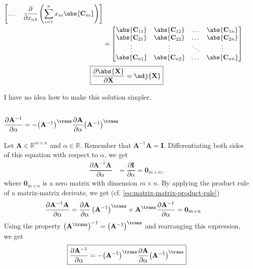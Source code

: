 \begin{align}
\begin{bmatrix}
        \dots & 
        \displaystyle \dfrac{\partial}{\partial x_{n3}} \left( \sum_{i = 1}^{n} x_{ni} \abs{\mathbf{C}_{ni}} \right) \\
    \end{bmatrix} \\
    &= \begin{bmatrix}
        \abs{\mathbf{C}_{11}} & \abs{\mathbf{C}_{12}} & \dots & \abs{\mathbf{C}_{1n}} \\
        \abs{\mathbf{C}_{21}} & \abs{\mathbf{C}_{22}} & \dots & \abs{\mathbf{C}_{2n}} \\
        \vdots & \vdots & \ddots & \vdots \\
        \abs{\mathbf{C}_{n1}} & \abs{\mathbf{C}_{n2}} & \dots & \abs{\mathbf{C}_{nn}} \\
    \end{bmatrix}
\end{align}
\begin{align}
    \boxed{\dfrac{\partial \abs{\mathbf{X}}}{\partial \mathbf{X}} = \adj{\mathbf{X}}}
\end{align}

I have no idea how to make this solution simpler.

\subsection{\(\dfrac{\partial \mathbf{A}^{-1}}{\partial \alpha} = - {\left( \mathbf{A}^{-1} \right)}^{\trans} \dfrac{\partial \mathbf{A}}{\partial \alpha} {\left( \mathbf{A}^{-1} \right)}^{\trans}\)}
Let \(\mathbf{A}\in \mathbb{R}^{m\times n}\) and \(\alpha \in \mathbb{R}\). Remember that \(\mathbf{A}^{-1}\mathbf{A} = \mathbf{I}\). Differentiating both sides of this equation with respect to \(\alpha\), we get
\begin{align}
    \dfrac{\partial \mathbf{A}^{-1}\mathbf{A}}{\partial \alpha} & = \dfrac{\partial \mathbf{I}}{\partial \alpha} = \mathbf{0}_{m \times n},
\end{align}
where \(\mathbf{0}_{m \times n}\) is a zero matrix with dimension \(m \times n\). By applying the product rule of a matrix-matrix derivate, we get (cf. \eqref{eq:matrix-matrix-product-rule})
\begin{align}
    \dfrac{\partial \mathbf{A}^{-1}\mathbf{A}}{\partial \alpha} =  \dfrac{\partial \mathbf{A}}{\partial \alpha} \left( \mathbf{A}^{-1} \right)^{\trans} + \mathbf{A}^{\trans} \dfrac{\partial \mathbf{A}^{-1}}{\partial \alpha} & = \mathbf{0}_{m \times n}
\end{align}
Using the property \(\left( \mathbf{A}^{\trans} \right)^{-1} = \left( \mathbf{A}^{-1} \right)^{\trans}\) and rearranging this expression, we get
\begin{align}
    \boxed{\dfrac{\partial \mathbf{A}^{-1}}{\partial \alpha} = - {\left( \mathbf{A}^{-1} \right)}^{\trans} \dfrac{\partial \mathbf{A}}{\partial \alpha} {\left( \mathbf{A}^{-1} \right)}^{\trans}}
\end{align}

\nocite{*}
\printbibliography
